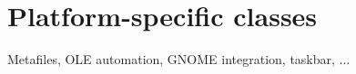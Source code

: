 \chapter{Platform-specific classes}\label{chapplatform}
%
%
\setfooter{\thepage}{}{}{}{}{\thepage}%

Metafiles, OLE automation, GNOME integration, taskbar, ...

